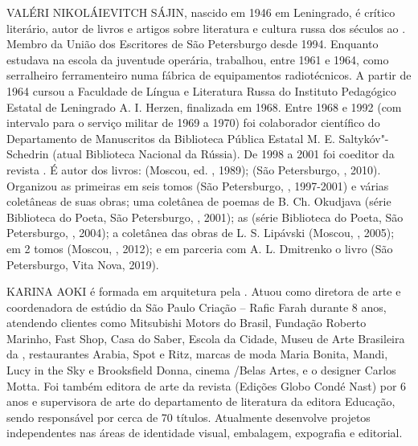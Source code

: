 \noindent{}VALÉRI NIKOLÁIEVITCH SÁJIN, nascido em 1946 em Leningrado, é crítico
literário, autor de livros e artigos sobre literatura e cultura russa
dos séculos \scalebox{.8}{XVIII} ao \scalebox{.8}{XX}.
Membro da União dos Escritores de São
Petersburgo desde 1994. Enquanto estudava na escola da juventude
operária, trabalhou, entre 1961 e 1964, como serralheiro ferramenteiro
numa fábrica de equipamentos radiotécnicos. A partir de 1964 cursou a
Faculdade de Língua e Literatura Russa do Instituto Pedagógico Estatal
de Leningrado A. I. Herzen, finalizada em 1968. Entre 1968 e 1992 (com
intervalo para o serviço militar de 1969 a 1970) foi colaborador
científico do Departamento de Manuscritos da Biblioteca Pública Estatal
M. E. Saltykóv"-Schedrin (atual Biblioteca Nacional da Rússia). De 1998 a
2001 foi coeditor da revista {}. É autor dos livros: {} (Moscou, ed.
{}, 1989); {} (São Petersburgo, {}, 2010). Organizou as
primeiras {} em seis tomos (São
Petersburgo, {}, 1997-2001) e várias
coletâneas de suas obras; uma coletânea de poemas de B. Ch. Okudjava
(série Biblioteca do Poeta, São Petersburgo, {}, 2001); as {} (série
Biblioteca do Poeta, São Petersburgo, {},
2004); a coletânea das obras de L. S. Lipávski {}
(Moscou, {}, 2005); {} em
2 tomos (Moscou, {}, 2012); e em
parceria com A. L. Dmitrenko o livro {} (São Petersburgo,
Vita Nova, 2019).

\medskip

\noindent{}KARINA AOKI é formada em arquitetura pela \scalebox{.8}{FAU-USP}. Atuou como diretora de arte e coordenadora de estúdio da São Paulo Criação – Rafic Farah
durante 8 anos, atendendo clientes como Mitsubishi Motors do Brasil,
Fundação Roberto Marinho, Fast Shop, Casa do Saber, Escola da Cidade,
Museu de Arte Brasileira da \scalebox{.8}{FAAP}, restaurantes Arabia, Spot e Ritz,
marcas de moda Maria Bonita, Mandi, Lucy in the Sky e Brooksfield Donna,
cinema \scalebox{.8}{HSBC}/Belas Artes, e o designer Carlos Motta. Foi também editora
de arte da revista {} (Edições Globo Condé Nast) por 6 anos e
supervisora de arte do departamento de literatura da editora \scalebox{.8}{FTD}
Educação, sendo responsável por cerca de 70 títulos. Atualmente
desenvolve projetos independentes nas áreas de identidade visual,
embalagem, expografia e editorial.


